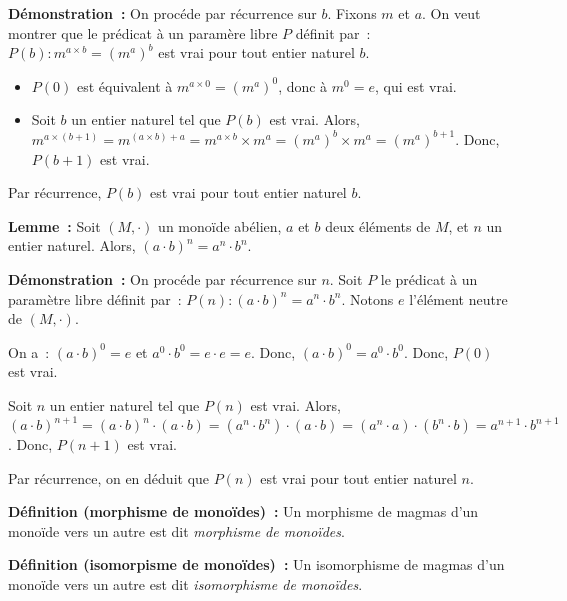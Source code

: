 \medskip

\noindent\textbf{Démonstration :} On procéde par récurrence sur $b$.
    Fixons $m$ et $a$.
    On veut montrer que le prédicat à un paramère libre $P$ définit par : $P(b): m^{a \times b} = (m^a)^b$ est vrai pour tout entier naturel $b$.
    \begin{itemize}[nosep]
        \item $P(0)$ est équivalent à $m^{a \times 0} = (m^a)^0$, donc à $m^0 = e$, qui est vrai.
        \item Soit $b$ un entier naturel tel que $P(b)$ est vrai. 
            Alors, $m^{a \times (b+1)} = m^{(a \times b) + a} = m^{a \times b} \times m^a = (m^a)^b \times m^a = (m^a)^{b+1}$.
            Donc, $P(b+1)$ est vrai.
    \end{itemize}
    Par récurrence, $P(b)$ est vrai pour tout entier naturel $b$.

    \done

\medskip

\noindent\textbf{Lemme :} Soit $(M, \cdot)$ un monoïde abélien, $a$ et $b$ deux éléments de $M$, et $n$ un entier naturel. 
    Alors, $(a \cdot b)^n = a^n \cdot b^n$.

\medskip

\noindent\textbf{Démonstration :} On procéde par récurrence sur $n$.
    Soit $P$ le prédicat à un paramètre libre définit par : $P(n): (a \cdot b)^n = a^n \cdot b^n$.
    Notons $e$ l'élément neutre de $(M, \cdot)$.

    On a : $(a \cdot b)^0 = e$ et $a^0 \cdot b^0 = e \cdot e = e$.
    Donc, $(a \cdot b)^0 = a^0 \cdot b^0$.
    Donc, $P(0)$ est vrai.

    Soit $n$ un entier naturel tel que $P(n)$ est vrai. 
    Alors, $(a \cdot b)^{n+1} = (a \cdot b)^n \cdot (a \cdot b) = (a^n \cdot b^n) \cdot (a \cdot b) = (a^n \cdot a) \cdot (b^n \cdot b) = a^{n+1} \cdot b^{n+1}$.
    Donc, $P(n+1)$ est vrai.

    Par récurrence, on en déduit que $P(n)$ est vrai pour tout entier naturel $n$.

    \done

\medskip

\noindent\textbf{Définition (morphisme de monoïdes) :} Un morphisme de magmas d'un monoïde vers un autre est dit \textit{morphisme de monoïdes}.

\medskip

\noindent\textbf{Définition (isomorpisme de monoïdes) :} Un isomorphisme de magmas d'un monoïde vers un autre est dit \textit{isomorphisme de monoïdes}.

